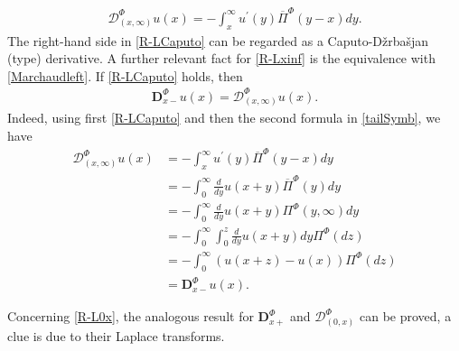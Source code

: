 \documentclass[11pt,a4paper]{article}
\theoremstyle{plain}
\theoremstyle{definition}
\theoremstyle{remark}
\begin{document}
		\begin{align}
			\label{R-LCaputo}
			\mathcal{D}_{(x,\infty)}^\Phi u(x)=- \int_x^{\infty} u^\prime(y) \overline{\Pi}^\Phi(y-x) dy.
		\end{align}
		The right-hand side in \eqref{R-LCaputo} can be regarded as a Caputo-D\v{z}rba\v{s}jan (type) derivative. A further relevant fact for \eqref{R-Lxinf} is the equivalence with \eqref{Marchaudleft}. If \eqref{R-LCaputo} holds, then
		\begin{align}
			\label{MarchaudR-L}
			\mathbf{D}_{x-}^\Phi u(x)=\mathcal{D}_{(x,\infty)}^\Phi u(x).
		\end{align}
		Indeed,	using first \eqref{R-LCaputo} and then the second formula in \eqref{tailSymb}, we have
		\begin{align*}
			\mathcal{D}_{(x,\infty)}^\Phi u(x)&=- \int_x^{\infty} u^\prime(y) \overline{\Pi}^\Phi(y-x) dy\\
			&=-\int_0^\infty \frac{d}{dy}u(x+y) \overline{\Pi}^\Phi(y) dy\\
			&=- \int_0^\infty \frac{d}{dy}u(x+y) \Pi^\Phi(y,\infty) dy\\
			&{=}-\int_0^\infty \int_0^z \frac{d}{dy} u(x+y) dy \Pi^\Phi(dz)\\
			&=-\int_0^\infty (u(x+z)-u(x)) \Pi^\Phi(dz)\\
			&=\mathbf{D}_{x-}^\Phi u(x).
		\end{align*}
		
		
		
		Concerning \eqref{R-L0x}, the analogous result for $\mathbf{D}_{x+}^\Phi$ and  $\mathcal{D}_{(0,x)}^\Phi$ can be proved, a clue
		is due to their Laplace transforms.
		
\end{document}
